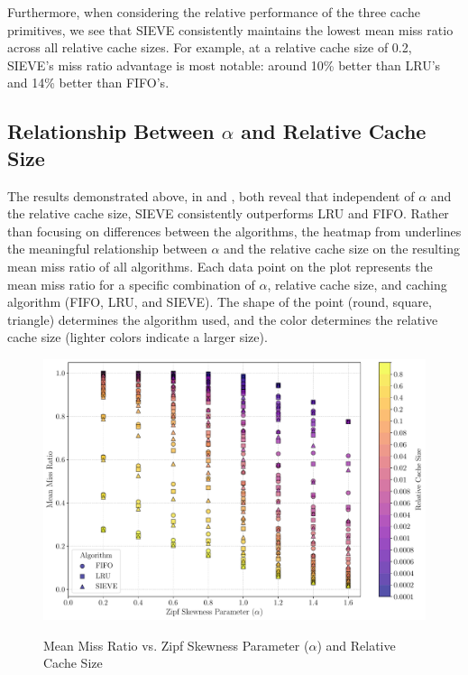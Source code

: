 Furthermore, when considering the relative performance of the three cache primitives, we see that SIEVE consistently maintains the lowest mean miss ratio across all relative cache sizes. For example, at a relative cache size of 0.2, SIEVE's miss ratio advantage is most notable: around 10\% better than LRU's and 14\% better than FIFO's.

\subsection{Relationship Between $\alpha$ and Relative Cache Size}


The results demonstrated above, in  and , both reveal that independent of $\alpha$ and the relative cache size, SIEVE consistently outperforms LRU and FIFO. Rather than focusing on differences between the algorithms, the heatmap from  underlines the meaningful relationship between $\alpha$ and the relative cache size on the resulting mean miss ratio of all algorithms. Each data point on the plot represents the mean miss ratio for a specific combination of $\alpha$, relative cache size, and caching algorithm (FIFO, LRU, and SIEVE). The shape of the point (round, square, triangle) determines the algorithm used, and the color determines the relative cache size (lighter colors indicate a larger size).

\begin{figure}[h!]
    \centering
    \caption{Mean Miss Ratio vs. Zipf Skewness Parameter ($\alpha$) and Relative Cache Size}
    \includegraphics[width=\linewidth]{figures/simulations/miss_ratio_heat_map_no_title.pdf}
    \label{fig:miss-ratio-heatmap}
\end{figure}


